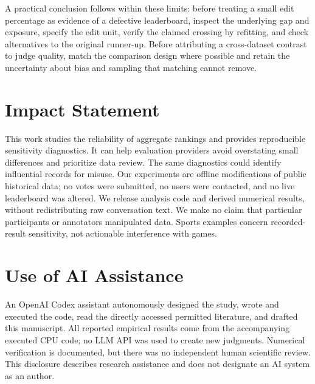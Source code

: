 \documentclass{article}
\begin{document}
A practical conclusion follows within these limits: before treating a small edit percentage as evidence of a defective leaderboard, inspect the underlying gap and exposure, specify the edit unit, verify the claimed crossing by refitting, and check alternatives to the original runner-up. Before attributing a cross-dataset contrast to judge quality, match the comparison design where possible and retain the uncertainty about bias and sampling that matching cannot remove.

\clearpage
\section*{Impact Statement}
This work studies the reliability of aggregate rankings and provides reproducible sensitivity diagnostics. It can help evaluation providers avoid overstating small differences and prioritize data review. The same diagnostics could identify influential records for misuse. Our experiments are offline modifications of public historical data; no votes were submitted, no users were contacted, and no live leaderboard was altered. We release analysis code and derived numerical results, without redistributing raw conversation text. We make no claim that particular participants or annotators manipulated data. Sports examples concern recorded-result sensitivity, not actionable interference with games.

\section*{Use of AI Assistance}
An OpenAI Codex assistant autonomously designed the study, wrote and executed the code, read the directly accessed permitted literature, and drafted this manuscript. All reported empirical results come from the accompanying executed CPU code; no LLM API was used to create new judgments. Numerical verification is documented, but there was no independent human scientific review. This disclosure describes research assistance and does not designate an AI system as an author.




\clearpage
\appendix
\onecolumn
\end{document}
